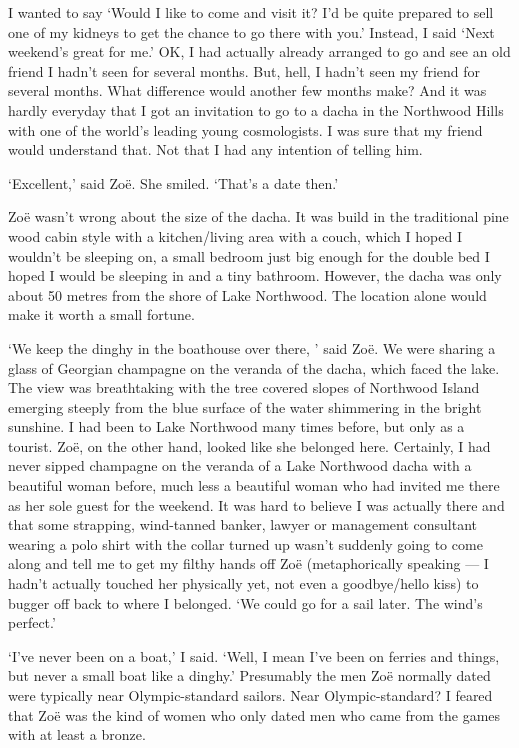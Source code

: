 I wanted to say `Would I like to come and visit it? I'd be quite
prepared to sell one of my kidneys to get the chance to go there
with you.' Instead, I said `Next weekend's great for me.' OK, I had
actually already arranged to go and see an old friend I hadn't seen
for several months. But, hell, I hadn't seen my friend for several
months. What difference would another few months make? And it was
hardly everyday that I got an invitation to go to a dacha in the
Northwood Hills with one of the world's leading young cosmologists.
I was sure that my friend would understand that. Not that I had any
intention of telling him.

`Excellent,' said Zoë. She smiled. `That's a date then.'

Zoë wasn't wrong about the size of the dacha. It was build in
the traditional pine wood cabin style with a kitchen/living area
with a couch, which I hoped I wouldn't be sleeping on, a small
bedroom just big enough for the double bed I hoped I would be
sleeping in and a tiny bathroom. However, the dacha was only about
50 metres from the shore of Lake Northwood. The location alone would
make it worth a small fortune.

`We keep the dinghy in the boathouse over there, ' said Zoë. We
were sharing a glass of Georgian champagne on the veranda of the
dacha, which faced the lake. The view was breathtaking with the tree
covered slopes of Northwood Island emerging steeply from the blue
surface of the water shimmering in the bright sunshine. I had been
to Lake Northwood many times before, but only as a tourist. Zoë,
on the other hand, looked like she belonged here. Certainly, I had
never sipped champagne on the veranda of a Lake Northwood dacha with
a beautiful woman before, much less a beautiful woman who had
invited me there as her sole guest for the weekend. It was hard to
believe I was actually there and that some strapping, wind-tanned
banker, lawyer or management consultant wearing a polo shirt with
the collar turned up wasn't suddenly going to come along and tell me
to get my filthy hands off Zoë (metaphorically speaking --- I
hadn't actually touched her physically yet, not even a goodbye/hello kiss) to bugger off back to where
I belonged. `We could go for a sail later. The wind's perfect.'

`I've never been on a boat,' I said. `Well, I mean I've been on
ferries and things, but never a small boat like a dinghy.'
Presumably the men Zoë normally dated were typically near
Olympic-standard sailors. Near Olympic-standard? I feared that
Zoë was the kind of women who only dated men who came from the
games with at least a bronze.

